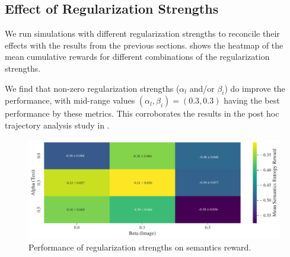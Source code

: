 
\subsection{Effect of Regularization Strengths}
\label{sec:alpha-beta-semantics}
We run simulations with different regularization strengths to reconcile their effects with the results from the previous sections.
 shows the heatmap of the mean cumulative rewards for different combinations of the regularization strengths.

We find that non-zero regularization strengths (\(\alpha_{l}\) and/or \(\beta_{i}\)) do improve the performance, with mid-range values \((\alpha_{l}, \beta_{i}) = (0.3, 0.
3)\) having the best performance by these metrics.
This corroborates the results in the post hoc trajectory analysis study in .

\begin{figure}[H]
    \centering
    \includegraphics[width=\textwidth]{images/alpha_beta-semantics_rair_with_std.pdf}
    \caption{Performance of regularization strengths on semantics reward.}
    \label{fig:alpha-beta-semantics}
\end{figure}

